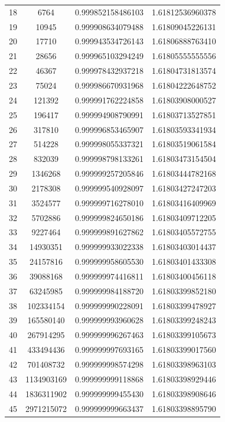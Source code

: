 \begin{table}[!h]
\begin{tabular}{|c|c|c|c|}
18 & 6764 & 0.999852158486103 & 1.61812536960378 \\
19 & 10945 & 0.999908634079488 & 1.61809045226131 \\
20 & 17710 & 0.999943534726143 & 1.61806888763410 \\
21 & 28656 & 0.999965103294249 & 1.61805555555556 \\
22 & 46367 & 0.999978432937218 & 1.61804731813574 \\
23 & 75024 & 0.999986670931968 & 1.61804222648752 \\
24 & 121392 & 0.999991762224858 & 1.61803908000527 \\
25 & 196417 & 0.999994908790991 & 1.61803713527851 \\
26 & 317810 & 0.999996853465907 & 1.61803593341934 \\
27 & 514228 & 0.999998055337321 & 1.61803519061584 \\
28 & 832039 & 0.999998798133261 & 1.61803473154504 \\
29 & 1346268 & 0.999999257205846 & 1.61803444782168 \\
30 & 2178308 & 0.999999540928097 & 1.61803427247203 \\
31 & 3524577 & 0.999999716278010 & 1.61803416409969 \\
32 & 5702886 & 0.999999824650186 & 1.61803409712205 \\
33 & 9227464 & 0.999999891627862 & 1.61803405572755 \\
34 & 14930351 & 0.999999933022338 & 1.61803403014437 \\
35 & 24157816 & 0.999999958605530 & 1.61803401433308 \\
36 & 39088168 & 0.999999974416811 & 1.61803400456118 \\
37 & 63245985 & 0.999999984188720 & 1.61803399852180 \\
38 & 102334154 & 0.999999990228091 & 1.61803399478927 \\
39 & 165580140 & 0.999999993960628 & 1.61803399248243 \\
40 & 267914295 & 0.999999996267463 & 1.61803399105673 \\
41 & 433494436 & 0.999999997693165 & 1.61803399017560 \\
42 & 701408732 & 0.999999998574298 & 1.61803398963103 \\
43 & 1134903169 & 0.999999999118868 & 1.61803398929446 \\
44 & 1836311902 & 0.999999999455430 & 1.61803398908646 \\
45 & 2971215072 & 0.999999999663437 & 1.61803398895790 \\

\end{tabular}
\end{table}
